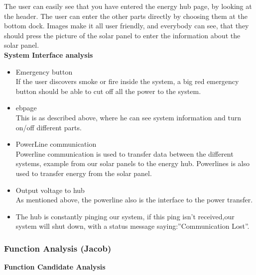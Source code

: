 \documentclass[12pt,a4paper]{report}
\begin{document}
The user can easily see that you have entered the energy hub page, by looking at the header. The user can enter the other parts directly by choosing them at the bottom dock. Images make it all user friendly, and everybody can see, that they should press the picture of the solar panel to enter the information about the solar panel.\\
\textbf{System Interface analysis}

\begin{itemize}
\item Emergency button
\\If the user discovers smoke or fire inside the system, a big red emergency button should be able to cut off all the power to the system.
\item ebpage
\\This is as described above, where he can see system information and turn on/off different parts.
\item PowerLine communication
\\Powerline communication is used to transfer data between the different systems, example from our solar panels to the energy hub. Powerlines is also used to transfer energy from the solar panel. 
\item Output voltage to hub
\\As mentioned above, the powerline also is the interface to the power transfer. 
\item The hub is constantly pinging our system, if this ping isn’t received,our system will shut down, with a status message saying:”Communication Lost”.
\end{itemize}

\subsubsection{Function Analysis (Jacob)}
\textbf{Function Candidate Analysis}
\end{document}
